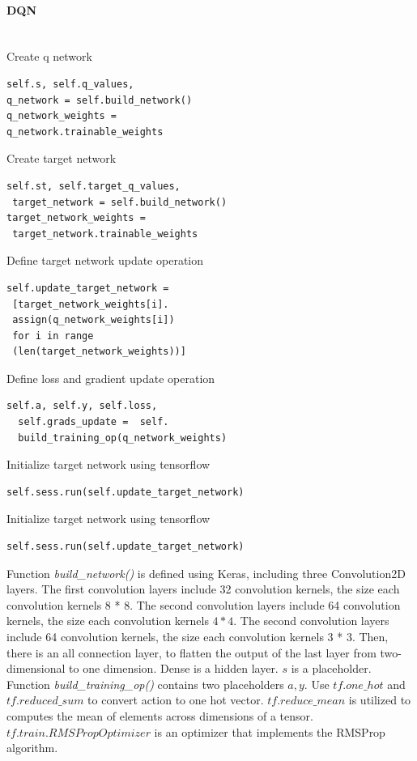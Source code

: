 \documentclass[10pt,twocolumn,letterpaper]{article}
\begin{document}
\paragraph{DQN}$\ $\\
Create q network
\begin{lstlisting}[frame=shadowbox]
self.s, self.q_values, 
q_network = self.build_network()
q_network_weights =
q_network.trainable_weights
\end{lstlisting}
Create target network
\begin{lstlisting}[frame=shadowbox]
self.st, self.target_q_values,
 target_network = self.build_network()
target_network_weights =
 target_network.trainable_weights
\end{lstlisting}
Define target network update operation
\begin{lstlisting}[frame=shadowbox]
self.update_target_network =
 [target_network_weights[i].
 assign(q_network_weights[i]) 
 for i in range
 (len(target_network_weights))]
\end{lstlisting}
Define loss and gradient update operation
\begin{lstlisting}[frame=shadowbox]
 self.a, self.y, self.loss,
  self.grads_update =  self.
  build_training_op(q_network_weights)
\end{lstlisting}
Initialize target network using tensorflow
\begin{lstlisting}[frame=shadowbox]
self.sess.run(self.update_target_network)
\end{lstlisting}
Initialize target network using tensorflow
\begin{lstlisting}[frame=shadowbox]
self.sess.run(self.update_target_network)
\end{lstlisting}
Function \emph{build\_network()} is defined using Keras, including three Convolution2D layers.
The first convolution layers include 32 convolution kernels, the size each convolution kernels 8 * 8. The second convolution layers include 64 convolution kernels, the size each convolution kernels $4 * 4$. The second convolution layers include 64 convolution kernels, the size each convolution kernels 3 * 3. Then, there is an all connection layer, to flatten the output of the last layer from two-dimensional to one dimension. Dense is a hidden layer. $s$ is a placeholder.\\
Function \emph{build\_training\_op()} contains two placeholders $a,y$. Use $tf.one\_hot$ and $tf.reduced\_sum$ to convert action to one hot vector. $tf.reduce\_mean$ is utilized to computes the mean of elements across dimensions of a tensor. $tf.train.RMSPropOptimizer$ is an optimizer that implements the RMSProp algorithm.\\
\end{document}
